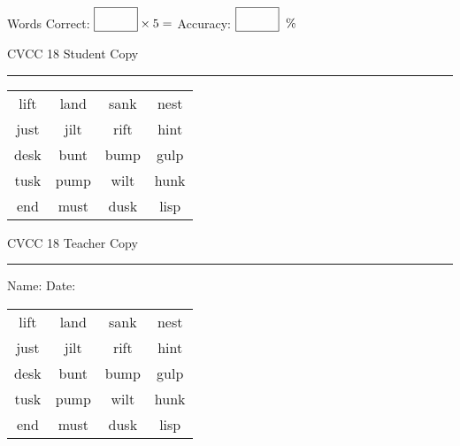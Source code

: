 \documentclass{memoir}
\begin{document}
\small

Words Correct: $\fbox{\phantom{\huge 100}} \times 5 = $ Accuracy: $\fbox{\phantom{\huge 100}}\;\; \%$ 

\vfill

\newpage


\footnotesize \noindent
CVCC 18 \hfill Student Copy
\smallskip
\hrule

\Large

\setlength{\tabcolsep}{14pt}
\def\arraystretch{3}

{\selectfont


\begin{vplace}[0.5]
\begin{center}
\begin{tabular}{cccc}
lift & land & sank & nest \\
just & jilt & rift & hint \\
desk & bunt & bump & gulp \\
tusk & pump & wilt & hunk \\
end & must & dusk & lisp \\
\end{tabular}
\end{center}
\end{vplace}

}

\newpage

\footnotesize \noindent
CVCC 18 \hfill Teacher Copy
\smallskip
\hrule

\small

\vfill

\noindent
Name: \underline{\hspace{1.75in}} \hfill Date: \underline{\hspace{1in}}

\Large

{\selectfont


\begin{vplace}[0.5]
\begin{center}
\begin{tabular}{cccc}
lift & land & sank & nest \\
just & jilt & rift & hint \\
desk & bunt & bump & gulp \\
tusk & pump & wilt & hunk \\
end & must & dusk & lisp \\
\end{tabular}
\end{center}
\end{vplace}



}
\end{document}
